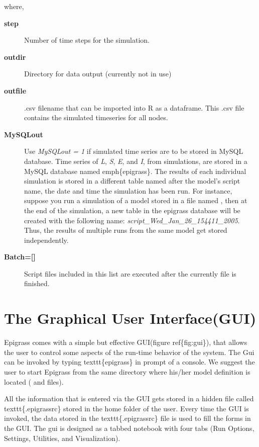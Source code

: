 \documentclass[a4paper,10pt]{manual}
\begin{document}
where,
\begin{description}
\item[\textbf{step}]
Number of time steps for the simulation.

\item[\textbf{outdir}]
Directory for data output (currently not in use)

\item[\textbf{outfile}]
.csv filename that can be imported into R as a dataframe. This .csv file contains the simulated timeseries for all nodes.

\item[\textbf{MySQLout}]
Use \emph{MySQLout = 1} if simulated time series are to be stored in MySQL database. Time series of \emph{L}, \emph{S}, \emph{E}, and \emph{I}, from simulations, are stored in a MySQL database named emph\{epigrass\}. The results of each individual simulation is stored in a different table named after the model's script name, the date and time the simulation has been run. For instance, suppose you run a simulation of a model stored in a file named , then at the end of the simulation, a new table in the epigrass database will be created with the following name: \emph{script\_Wed\_Jan\_26\_154411\_2005}. Thus, the results of multiple runs from the same model get stored independently.

\item[\textbf{Batch={[}{]}}]
Script files included in this list are executed after the currently file is finished.

\end{description}


\section{The Graphical User Interface(GUI)}

Epigrass comes with a simple but effective GUI(figure ref\{fig:gui\}), that allows the user to control some aspects of the run-time behavior of the system. The Gui can be invoked by typing texttt\{epigrass\} in prompt of a console. We suggest the user to start Epigrass from the same directory where his/her model definition is located ( and    files).

All the information that is entered via the GUI gets  stored in a hidden file called texttt\{.epigrassrc\} stored in the home folder of the user. Every time the GUI is invoked, the data stored in the texttt\{.epigrassrc\} file is used to fill the forms in the GUI. The gui is designed as a tabbed notebook with four tabs (Run Options, Settings, Utilities, and Visualization).
\end{document}
